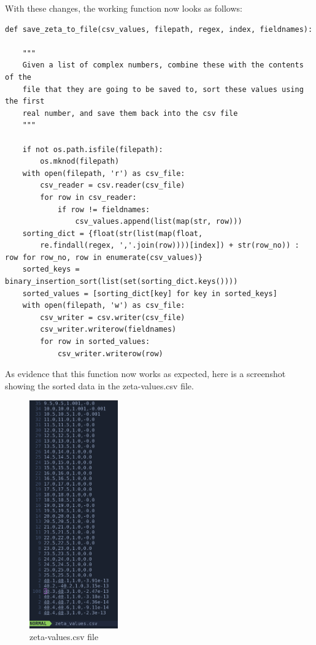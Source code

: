 \documentclass[12pt]{article}
\begin{document}
With these changes, the working function now looks as follows:

\begin{lstlisting}
def save_zeta_to_file(csv_values, filepath, regex, index, fieldnames):

    """
    Given a list of complex numbers, combine these with the contents of the
    file that they are going to be saved to, sort these values using the first
    real number, and save them back into the csv file
    """

    if not os.path.isfile(filepath):
        os.mknod(filepath)
    with open(filepath, 'r') as csv_file:
        csv_reader = csv.reader(csv_file)
        for row in csv_reader:
            if row != fieldnames:
                csv_values.append(list(map(str, row)))
    sorting_dict = {float(str(list(map(float,
        re.findall(regex, ','.join(row))))[index]) + str(row_no)) : row for row_no, row in enumerate(csv_values)}
    sorted_keys = binary_insertion_sort(list(set(sorting_dict.keys())))
    sorted_values = [sorting_dict[key] for key in sorted_keys]
    with open(filepath, 'w') as csv_file:
        csv_writer = csv.writer(csv_file)
        csv_writer.writerow(fieldnames)
        for row in sorted_values:
            csv_writer.writerow(row)
\end{lstlisting}


As evidence that this function now works as expected, here is a screenshot showing the sorted data in the zeta-values.csv file.

\begin{figure}[h]
    \centering
    \includegraphics[width=1.5in]{zeta-values-ev}
    \caption{zeta-values.csv file}
\end{figure}
\end{document}
